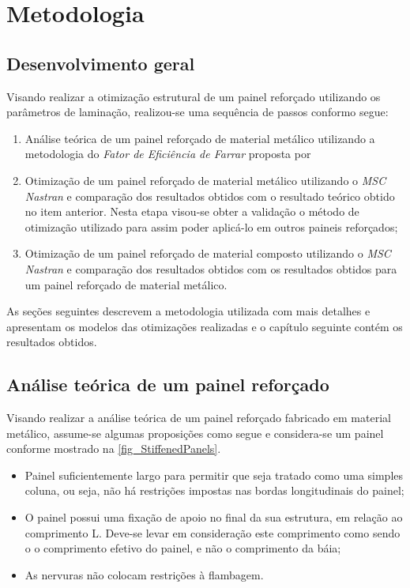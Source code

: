  \chapter[Metodologia]{Metodologia}

 \section{Desenvolvimento geral}
Visando realizar a otimização estrutural de um painel reforçado utilizando os parâmetros de laminação, realizou-se uma sequência de passos conformo segue:
\begin{enumerate}
  \item Análise teórica de um painel reforçado de material metálico utilizando a metodologia do \emph{Fator de Eficiência de Farrar} proposta por \cite{niu1997airframe}
  \item Otimização de um painel reforçado de material metálico utilizando o \emph{MSC Nastran} e comparação dos resultados obtidos com o resultado teórico obtido no item anterior. Nesta etapa visou-se obter a validação o método de otimização utilizado para assim poder aplicá-lo em outros paineis reforçados;
  \item Otimização de um painel reforçado de material composto utilizando o \emph{MSC Nastran} e comparação dos resultados obtidos com os resultados obtidos para um painel reforçado de material metálico.
\end {enumerate}

As seções seguintes descrevem a metodologia utilizada com mais detalhes e apresentam os modelos das otimizações realizadas e o capítulo seguinte contém os resultados obtidos.

\section{Análise teórica de um painel reforçado}
Visando realizar a análise teórica de um painel reforçado fabricado em material metálico, assume-se algumas proposições como segue e considera-se um painel conforme mostrado na \autoref{fig_StiffenedPanels}.

\begin{itemize}
\item Painel suficientemente largo para permitir que seja tratado como uma simples coluna, ou seja, não há restrições impostas nas bordas longitudinais do painel;
\item O painel possui uma fixação de apoio no final da sua estrutura, em relação ao comprimento L. Deve-se levar em consideração este comprimento como sendo o o comprimento efetivo do painel, e não o comprimento da báia;
\item As nervuras não colocam restrições à flambagem.
\end{itemize}

